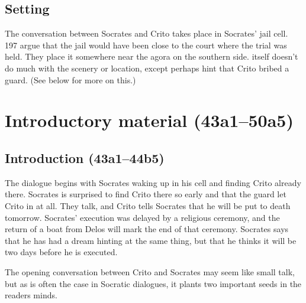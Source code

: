 \documentclass[11pt]{article}
\begin{document}

\subsection{Setting}

The conversation between Socrates and Crito takes place in Socrates' jail cell.
\citet{brickhouse2004} 197 argue that the jail would have been close to the
court where the trial was held.  They place it somewhere near the agora on the
southern side.   itself doesn't do much with the scenery or
location, except perhaps hint that Crito bribed a guard.  (See below for more
on this.)



\section{Introductory material (43a1--50a5)}

\subsection{Introduction (43a1--44b5)}

The dialogue begins with Socrates waking up in his cell and finding Crito
already there.  Socrates is surprised to find Crito there so early and that the
guard let Crito in at all.  They talk, and Crito tells Socrates that he will be
put to death tomorrow.  Socrates' execution was delayed by a religious
ceremony, and the return of a boat from Delos will mark the end of that
ceremony.  Socrates says that he has had a dream hinting at the same thing, but
that he thinks it will be two days before he is executed.

The opening conversation between Crito and Socrates may seem like small talk,
but as is often the case in Socratic dialogues, it plants two important seeds
in the readers minds.
\end{document}
